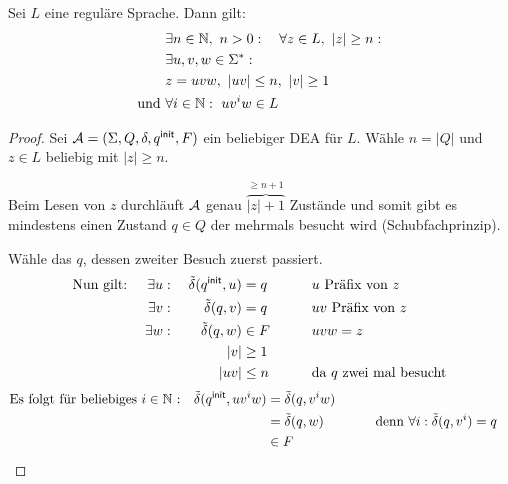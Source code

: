 \begin{lemma}\label{lem:pumping}
        Sei $L$ eine reguläre Sprache. Dann gilt:
        \begin{alignat*}{2}
                &\exists n\in\N,\ n>0:\quad \forall z\in L,\ |z|\geq n:\\
                &\exists u,v,w\in\Sigma^* :\\
                &z = uvw,\ |uv| \leq n,\ |v| \geq 1\\
                \text{und }& \forall i\in\N:\ uv^iw\in L
        \end{alignat*}
\end{lemma}
\vspace{-2em}
\begin{proof}
	Sei $\mathcal{A}=(\Sigma, Q,\delta,{q^\mathsf{init}},F)$ ein beliebiger \ac{DEA} für $L$.
	Wähle $n=|Q|$ und $z\in L$ beliebig mit $|z|\geq n$.
	
	\vspace{-1em}
	
	Beim Lesen von $z$ durchläuft $\mathcal{A}$ genau $\overbrace{|z|+1}^{\geq n+1}$ Zustände und somit gibt es mindestens einen Zustand $q\in Q$ der mehrmals besucht wird (Schubfachprinzip).
	
	Wähle das $q$, dessen zweiter Besuch zuerst passiert.
	\begin{alignat*}{3}
		\text{Nun gilt: }\quad
		\exists u:\; && \tilde\delta({q^\mathsf{init}},u)&=q &\qquad& u\text{ Präfix von }z\\
		\exists v:\; && \tilde\delta(q,v)&=q && uv\text{ Präfix von }z\\
		\exists w:\; && \tilde\delta(q,w)&\in F && uvw=z\\
		&& |v| &\geq 1\\
		&& |uv| &\leq n && \text{da $q$ zwei mal besucht}
	\end{alignat*}
	\begin{alignat*}{2}
		\text{Es folgt für beliebiges $i\in\mathbb{N}$ :}\quad \tilde\delta({q^\mathsf{init}},uv^iw) &= \tilde\delta(q,v^iw)\\
		&= \tilde\delta(q,w) &\qquad& \text{denn }\forall i: \tilde\delta(q,v^i)=q\\
		&\in F \tag*{\qedhere}
	\end{alignat*}
\end{proof}


